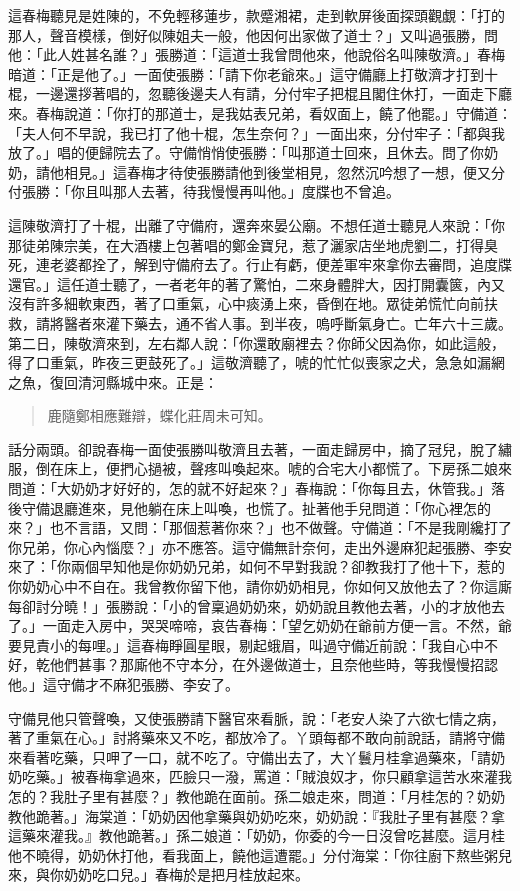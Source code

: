 這春梅聽見是姓陳的，不免輕移蓮步，款蹙湘裙，走到軟屏後面探頭觀覷：「打的那人，聲音模樣，倒好似陳姐夫一般，他因何出家做了道士？」又叫過張勝，問他：「此人姓甚名誰？」張勝道：「這道士我曾問他來，他說俗名叫陳敬濟。」春梅暗道：「正是他了。」一面使張勝：「請下你老爺來。」這守備廳上打敬濟才打到十棍，一邊還拶著唱的，忽聽後邊夫人有請，分付牢子把棍且閣住休打，一面走下廳來。春梅說道：「你打的那道士，是我姑表兄弟，看奴面上，饒了他罷。」守備道：「夫人何不早說，我已打了他十棍，怎生奈何？」一面出來，分付牢子：「都與我放了。」唱的便歸院去了。守備悄悄使張勝：「叫那道士回來，且休去。問了你奶奶，請他相見。」這春梅才待使張勝請他到後堂相見，忽然沉吟想了一想，便又分付張勝：「你且叫那人去著，待我慢慢再叫他。」度牒也不曾追。

這陳敬濟打了十棍，出離了守備府，還奔來晏公廟。不想任道士聽見人來說：「你那徒弟陳宗美，在大酒樓上包著唱的鄭金寶兒，惹了灑家店坐地虎劉二，打得臭死，連老婆都拴了，解到守備府去了。行止有虧，便差軍牢來拿你去審問，追度牒還官。」這任道士聽了，一者老年的著了驚怕，二來身體胖大，因打開囊篋，內又沒有許多細軟東西，著了口重氣，心中痰湧上來，昏倒在地。眾徒弟慌忙向前扶救，請將醫者來灌下藥去，通不省人事。到半夜，嗚呼斷氣身亡。亡年六十三歲。第二日，陳敬濟來到，左右鄰人說：「你還敢廟裡去？你師父因為你，如此這般，得了口重氣，昨夜三更鼓死了。」這敬濟聽了，唬的忙忙似喪家之犬，急急如漏網之魚，復回清河縣城中來。正是：
\begin{quote}
鹿隨鄭相應難辯，蝶化莊周未可知。
\end{quote}

話分兩頭。卻說春梅一面使張勝叫敬濟且去著，一面走歸房中，摘了冠兒，脫了繡服，倒在床上，便捫心撾被，聲疼叫喚起來。唬的合宅大小都慌了。下房孫二娘來問道：「大奶奶才好好的，怎的就不好起來？」春梅說：「你每且去，休管我。」落後守備退廳進來，見他躺在床上叫喚，也慌了。扯著他手兒問道：「你心裡怎的來？」也不言語，又問：「那個惹著你來？」也不做聲。守備道：「不是我剛纔打了你兄弟，你心內惱麼？」亦不應答。這守備無計奈何，走出外邊麻犯起張勝、李安來了：「你兩個早知他是你奶奶兄弟，如何不早對我說？卻教我打了他十下，惹的你奶奶心中不自在。我曾教你留下他，請你奶奶相見，你如何又放他去了？你這廝每卻討分曉！」張勝說：「小的曾稟過奶奶來，奶奶說且教他去著，小的才放他去了。」一面走入房中，哭哭啼啼，哀告春梅：「望乞奶奶在爺前方便一言。不然，爺要見責小的每哩。」這春梅睜圓星眼，剔起蛾眉，叫過守備近前說：「我自心中不好，乾他們甚事？那廝他不守本分，在外邊做道士，且奈他些時，等我慢慢招認他。」這守備才不麻犯張勝、李安了。

守備見他只管聲喚，又使張勝請下醫官來看脈，說：「老安人染了六欲七情之病，著了重氣在心。」討將藥來又不吃，都放冷了。丫頭每都不敢向前說話，請將守備來看著吃藥，只呷了一口，就不吃了。守備出去了，大丫鬟月桂拿過藥來，「請奶奶吃藥。」被春梅拿過來，匹臉只一潑，罵道：「賊浪奴才，你只顧拿這苦水來灌我怎的？我肚子里有甚麼？」教他跪在面前。孫二娘走來，問道：「月桂怎的？奶奶教他跪著。」海棠道：「奶奶因他拿藥與奶奶吃來，奶奶說：『我肚子里有甚麼？拿這藥來灌我。』教他跪著。」孫二娘道：「奶奶，你委的今一日沒曾吃甚麼。這月桂他不曉得，奶奶休打他，看我面上，饒他這遭罷。」分付海棠：「你往廚下熬些粥兒來，與你奶奶吃口兒。」春梅於是把月桂放起來。

